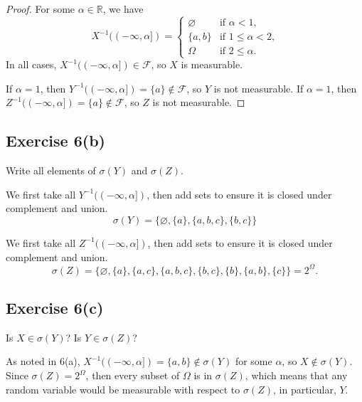 \documentclass[12pt]{article}
\newenvironment{problem}
    {\begin{lrbox}{\mybox}\begin{minipage}{\textwidth-10pt}}
    {\end{minipage}\end{lrbox}\framebox[\textwidth]{\usebox{\mybox}}}
\newcommand{\R}{\mathbb{R}}
\let\emptyset\varnothing
\newcommand{\FF}{\mathcal{F}}
\begin{document}
\begin{proof}
    For some $\alpha\in\R$, we have
    \[X^{-1}((-\infty,\alpha]) =
        \begin{cases}
            \emptyset &\text{if $\alpha < 1$,} \\
            \{a,b\} &\text{if $1\leq \alpha < 2$,} \\
            \Omega &\text{if $2\leq \alpha$.}
        \end{cases}
    \]
    In all cases, $X^{-1}((-\infty,\alpha])\in\FF$, so $X$ is measurable.
    
    If $\alpha=1$, then $Y^{-1}((-\infty,\alpha]) = \{a\}\notin\FF$, so $Y$ is not measurable. If $\alpha=1$, then $Z^{-1}((-\infty,\alpha]) = \{a\}\notin\FF$, so $Z$ is not measurable.
        
\end{proof}

\subsection*{Exercise 6(b)}
\begin{problem}
    Write all elements of $\sigma(Y)$ and $\sigma(Z)$.
\end{problem}
\medskip

We first take all $Y^{-1}((-\infty,\alpha])$, then add sets to ensure it is closed under complement and union.
\[\sigma(Y) = \{\emptyset, \{a\}, \{a,b,c\}, \{b,c\}\}\]

We first take all $Z^{-1}((-\infty,\alpha])$, then add sets to ensure it is closed under complement and union.
\[\sigma(Z) = \{\emptyset, \{a\}, \{a,c\}, \{a,b,c\}, \{b,c\}, \{b\}, \{a,b\}, \{c\}\} = 2^\Omega.\]

\subsection*{Exercise 6(c)}
\begin{problem}
    Is $X\in\sigma(Y)$? Is $Y\in\sigma(Z)$?
\end{problem}
\medskip

As noted in 6(a), $X^{-1}((-\infty,\alpha]) = \{a,b\} \notin \sigma(Y)$ for some $\alpha$, so $X\notin\sigma(Y)$. Since $\sigma(Z) = 2^\Omega$, then every subset of $\Omega$ is in $\sigma(Z)$, which means that any random variable would be measurable with respect to $\sigma(Z)$, in particular, $Y$.
\end{document}
